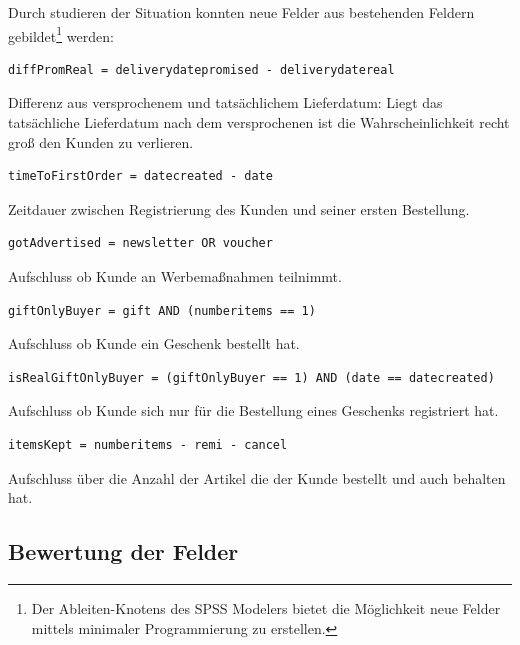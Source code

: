 \documentclass[a4paper,12pt]{article}
\begin{document}
Durch studieren der Situation konnten neue Felder aus bestehenden Feldern gebildet\footnote{Der Ableiten-Knotens des SPSS Modelers bietet die Möglichkeit neue Felder mittels minimaler Programmierung zu erstellen.} werden:  
\begin{framed}
\begin{verbatim}
diffPromReal = deliverydatepromised - deliverydatereal
\end{verbatim}
\end{framed}
Differenz aus versprochenem und tatsächlichem Lieferdatum: Liegt das tatsächliche Lieferdatum nach dem versprochenen ist die Wahrscheinlichkeit recht groß den Kunden zu verlieren. 
\begin{framed}
\begin{verbatim}
timeToFirstOrder = datecreated - date
\end{verbatim}
\end{framed}
Zeitdauer zwischen Registrierung des Kunden und seiner ersten Bestellung.
\begin{framed}
\begin{verbatim}
gotAdvertised = newsletter OR voucher
\end{verbatim}
\end{framed}
Aufschluss ob Kunde an Werbemaßnahmen teilnimmt.
\begin{framed}
\begin{verbatim}
giftOnlyBuyer = gift AND (numberitems == 1) 
\end{verbatim}
\end{framed}
Aufschluss ob Kunde ein Geschenk bestellt hat.
\begin{framed}
\begin{verbatim}
isRealGiftOnlyBuyer = (giftOnlyBuyer == 1) AND (date == datecreated)
\end{verbatim}
\end{framed}
Aufschluss ob Kunde sich nur für die Bestellung eines Geschenks registriert hat.
\begin{framed}
\begin{verbatim}
itemsKept = numberitems - remi - cancel 
\end{verbatim}
\end{framed}
Aufschluss  über die Anzahl der Artikel die der Kunde bestellt und auch behalten hat.


\newpage
\subsection{Bewertung der Felder}
\end{document}
